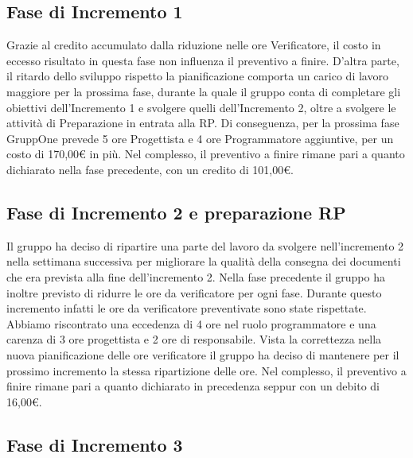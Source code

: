 \documentclass[../piano-di-progetto.tex]{subfiles}
\begin{document}
\subsection{Fase di Incremento 1}%
\label{sub:preventivo_a_finire/fase_di_incremento_1}

Grazie al credito accumulato dalla riduzione nelle ore Verificatore, il costo in eccesso risultato in questa fase non influenza il preventivo a finire.
D'altra parte, il ritardo dello sviluppo rispetto la pianificazione comporta un carico di lavoro maggiore per la prossima fase, durante la quale il gruppo conta di completare gli obiettivi dell'Incremento 1 e svolgere quelli dell'Incremento 2, oltre a svolgere le attività di Preparazione in entrata alla RP\@.
Di conseguenza, per la prossima fase GruppOne prevede 5 ore Progettista e 4 ore Programmatore aggiuntive, per un costo di 170,00€ in più.
Nel complesso, il preventivo a finire rimane pari a quanto dichiarato nella fase precedente, con un credito di 101,00€.

\subsection{Fase di Incremento 2 e preparazione RP}%
\label{sub:preventivo_a_finire/fase_di_incremento_2 e preparazione RP}

Il gruppo ha deciso di ripartire una parte del lavoro da svolgere nell'incremento 2 nella settimana successiva per migliorare la qualità della consegna dei documenti che era prevista alla fine dell'incremento 2.
Nella fase precedente il gruppo ha inoltre previsto di ridurre le ore da verificatore per ogni fase.
Durante questo incremento infatti le ore da verificatore preventivate sono state rispettate.
Abbiamo riscontrato una eccedenza di 4 ore nel ruolo programmatore e una carenza di 3 ore progettista e 2 ore di responsabile.
Vista la correttezza nella nuova pianificazione delle ore verificatore il gruppo ha deciso di mantenere per il prossimo incremento la stessa ripartizione delle ore.
Nel complesso, il preventivo a finire rimane pari a quanto dichiarato in precedenza seppur con un debito di 16,00€.


\subsection{Fase di Incremento 3}%
\label{sub:preventivo_a_finire/fase_di_incremento_3}
\end{document}
